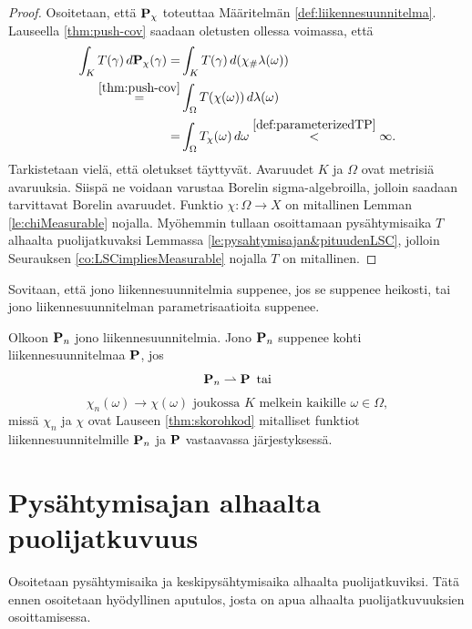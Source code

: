 \documentclass[12pt,oneside,a4paper]{amsbook} %
\begin{document}
\begin{proof}
Osoitetaan, että $\P_\chi$ toteuttaa Määritelmän \ref{def:liikennesuunnitelma}. Lauseella \ref{thm:push-cov} saadaan oletusten ollessa voimassa, että
\begin{align*}
    \int_K T(\gamma)\, d\P_\chi(\gamma) =& \int_K T(\gamma) \, d(\chi_\# \lambda(\omega)) \\
    \stackrel{\ref{thm:push-cov}}{=}& \int_\Omega T(\chi(\omega)) \, d\lambda(\omega) \\
    =& \int_\Omega T_\chi(\omega) \, d\omega \stackrel{\ref{def:parameterizedTP}}{<} \infty.
\end{align*}
Tarkistetaan vielä, että oletukset täyttyvät. Avaruudet $K$ ja $\Omega$ ovat metrisiä avaruuksia. Siispä ne voidaan varustaa Borelin sigma-algebroilla, jolloin saadaan tarvittavat Borelin avaruudet. Funktio $\chi:\Omega \to X$ on mitallinen Lemman \ref{le:chiMeasurable} nojalla. Myöhemmin tullaan osoittamaan pysähtymisaika $T$ alhaalta puolijatkuvaksi Lemmassa \ref{le:pysahtymisajan&pituudenLSC}, jolloin Seurauksen \ref{co:LSCimpliesMeasurable} nojalla $T$ on mitallinen. 
\end{proof}

Sovitaan, että jono liikennesuunnitelmia suppenee, jos se suppenee heikosti, tai jono liikennesuunnitelman parametrisaatioita suppenee.

\begin{definition}
    Olkoon $\P_n$ jono liikennesuunnitelmia. Jono $\P_n$ suppenee kohti liikennesuunnitelmaa $\P$, jos 
    $$\P_n \rightharpoonup \P \, \text{ tai}$$
    $$ \chi_n (\omega) \to  \chi (\omega) \text{ joukossa } K \text{ melkein kaikille } \omega
    \in \Omega,$$
    missä $ \chi_n$ ja $ \chi$ ovat Lauseen \ref{thm:skorohkod} mitalliset funktiot liikennesuunnitelmille $\P_n$ ja $\P$ vastaavassa järjestyksessä.
\end{definition}

\section{Pysähtymisajan alhaalta puolijatkuvuus}

Osoitetaan pysähtymisaika ja keskipysähtymisaika alhaalta puolijatkuviksi. Tätä ennen osoitetaan hyödyllinen aputulos, josta on apua alhaalta puolijatkuvuuksien osoittamisessa.
\end{document}
